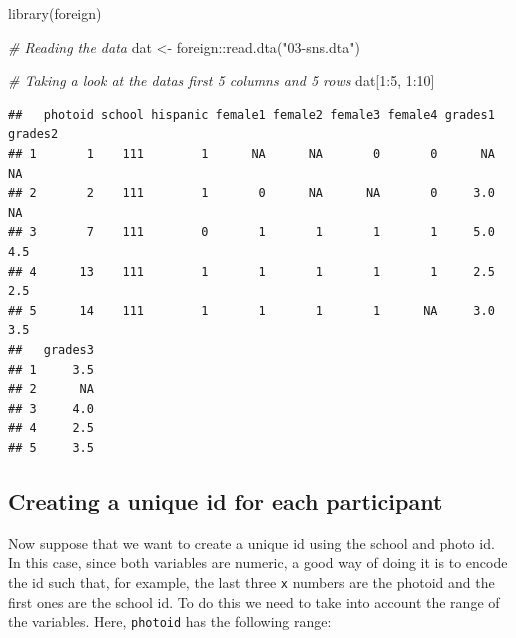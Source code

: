 \documentclass[
]{book}
\newenvironment{Shaded}{\begin{snugshade}}{\end{snugshade}}
\newcommand{\CommentTok}[1]{\textcolor[rgb]{0.56,0.35,0.01}{\textit{#1}}}
\newcommand{\DecValTok}[1]{\textcolor[rgb]{0.00,0.00,0.81}{#1}}
\newcommand{\FunctionTok}[1]{\textcolor[rgb]{0.00,0.00,0.00}{#1}}
\newcommand{\NormalTok}[1]{#1}
\newcommand{\OtherTok}[1]{\textcolor[rgb]{0.56,0.35,0.01}{#1}}
\newcommand{\SpecialCharTok}[1]{\textcolor[rgb]{0.00,0.00,0.00}{#1}}
\newcommand{\StringTok}[1]{\textcolor[rgb]{0.31,0.60,0.02}{#1}}
\begin{document}
\begin{Shaded}
\begin{Highlighting}[]
\FunctionTok{library}\NormalTok{(foreign)}

\CommentTok{\# Reading the data}
\NormalTok{dat }\OtherTok{\textless{}{-}}\NormalTok{ foreign}\SpecialCharTok{::}\FunctionTok{read.dta}\NormalTok{(}\StringTok{"03{-}sns.dta"}\NormalTok{)}

\CommentTok{\# Taking a look at the data\textquotesingle{}s first 5 columns and 5 rows}
\NormalTok{dat[}\DecValTok{1}\SpecialCharTok{:}\DecValTok{5}\NormalTok{, }\DecValTok{1}\SpecialCharTok{:}\DecValTok{10}\NormalTok{]}
\end{Highlighting}
\end{Shaded}

\begin{verbatim}
##   photoid school hispanic female1 female2 female3 female4 grades1 grades2
## 1       1    111        1      NA      NA       0       0      NA      NA
## 2       2    111        1       0      NA      NA       0     3.0      NA
## 3       7    111        0       1       1       1       1     5.0     4.5
## 4      13    111        1       1       1       1       1     2.5     2.5
## 5      14    111        1       1       1       1      NA     3.0     3.5
##   grades3
## 1     3.5
## 2      NA
## 3     4.0
## 4     2.5
## 5     3.5
\end{verbatim}

\hypertarget{creating-a-unique-id-for-each-participant}{%
\subsection{Creating a unique id for each participant}\label{creating-a-unique-id-for-each-participant}}

Now suppose that we want to create a unique id using the school and photo id. In this case, since both variables are numeric, a good way of doing it is to encode the id such that, for example, the last three \texttt{x} numbers are the photoid and the first ones are the school id. To do this we need to take into account the range of the variables. Here, \texttt{photoid} has the following range:

\begin{Shaded}
\end{Shaded}
\end{document}
